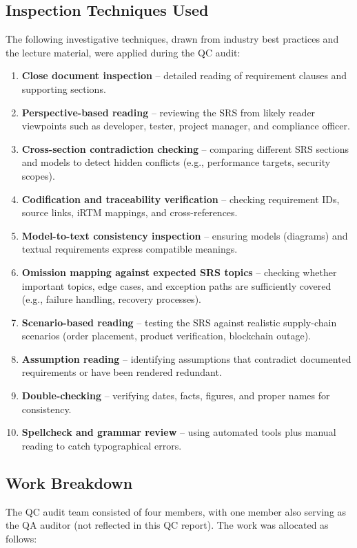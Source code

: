 \documentclass[11pt,a4paper]{article}
\begin{document}
\subsection{Inspection Techniques Used}
The following investigative techniques, drawn from industry best practices and the lecture material, were applied during the QC audit:
\begin{enumerate}[leftmargin=*]
\item \textbf{Close document inspection} -- detailed reading of requirement clauses and supporting sections.
\item \textbf{Perspective-based reading} -- reviewing the SRS from likely reader viewpoints such as developer, tester, project manager, and compliance officer.
\item \textbf{Cross-section contradiction checking} -- comparing different SRS sections and models to detect hidden conflicts (e.g., performance targets, security scopes).
\item \textbf{Codification and traceability verification} -- checking requirement IDs, source links, iRTM mappings, and cross-references.
\item \textbf{Model-to-text consistency inspection} -- ensuring models (diagrams) and textual requirements express compatible meanings.
\item \textbf{Omission mapping against expected SRS topics} -- checking whether important topics, edge cases, and exception paths are sufficiently covered (e.g., failure handling, recovery processes).
\item \textbf{Scenario-based reading} -- testing the SRS against realistic supply-chain scenarios (order placement, product verification, blockchain outage).
\item \textbf{Assumption reading} -- identifying assumptions that contradict documented requirements or have been rendered redundant.
\item \textbf{Double-checking} -- verifying dates, facts, figures, and proper names for consistency.
\item \textbf{Spellcheck and grammar review} -- using automated tools plus manual reading to catch typographical errors.
\end{enumerate}

\subsection{Work Breakdown}
The QC audit team consisted of four members, with one member also serving as the QA auditor (not reflected in this QC report). The work was allocated as follows:
\end{document}
